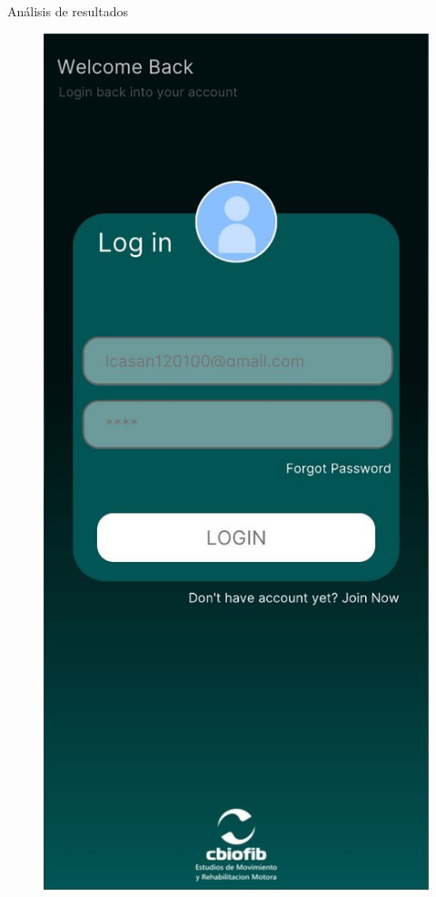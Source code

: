 \begin{thesischapter}{3} {Análisis de resultados}
    \begin{figure}[ht]
        \centering
        \includegraphics[scale=0.17]{images/ui/0.jpg}

\end{figure}
\end{thesischapter}
